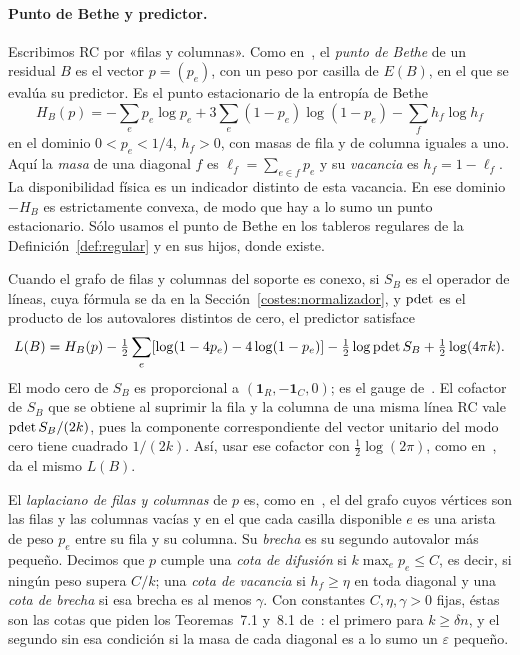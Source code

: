 \paragraph{Punto de Bethe y predictor.}
Escribimos RC por «filas y columnas». Como en~\cite{pred}, el \emph{punto de Bethe} de un residual
$B$ es el vector $p=(p_e)$, con un peso por casilla de $E(B)$, en el que se evalúa su predictor. Es
el punto estacionario de la entropía de Bethe
\begin{equation}\label{bethe}
 H_B(p)=-\sum_e p_e\log p_e+3\sum_e(1-p_e)\log(1-p_e)-\sum_fh_f\log h_f
\end{equation}
en el dominio $0<p_e<1/4$, $h_f>0$, con masas de fila y de columna iguales a uno. Aquí la
\emph{masa} de una diagonal $f$ es $\ell_f=\sum_{e\in f}p_e$ y su \emph{vacancia} es $h_f=1-\ell_f$.
La disponibilidad física es un indicador distinto de esta vacancia. En ese dominio $-H_B$ es
estrictamente convexa, de modo que hay a lo sumo un punto estacionario. Sólo usamos el punto de Bethe
en los tableros regulares de la Definición~\ref{def:regular} y en sus hijos, donde existe.

Cuando el grafo de filas y columnas del soporte es conexo, si $S_B$ es el operador de líneas, cuya
fórmula se da en la Sección~\ref{costes:normalizador}, y $\operatorname{pdet}$ es el producto de los autovalores
distintos de cero, el predictor satisface
\[
 L(B)=H_B(p)-\tfrac12\sum_e[\log(1-4p_e)-4\log(1-p_e)]
             -\tfrac12\log\operatorname{pdet} S_B+\tfrac12\log(4\pi k).
\]
El modo cero de $S_B$ es proporcional a $(\mathbf1_R,-\mathbf1_C,0)$; es el gauge de~\cite{pred}.
El cofactor de $S_B$ que se obtiene al suprimir la fila y la columna de una misma línea RC vale
$\operatorname{pdet} S_B/(2k)$, pues la componente correspondiente del vector unitario del modo cero tiene
cuadrado $1/(2k)$. Así, usar ese cofactor con $\tfrac12\log(2\pi)$, como
en~\cite[Secciones~6.1 y~7.1]{pred}, da el mismo $L(B)$.

El \emph{laplaciano de filas y columnas} de $p$ es, como en~\cite{pred}, el del grafo cuyos vértices
son las filas y las columnas vacías y en el que cada casilla disponible $e$ es una arista de peso
$p_e$ entre su fila y su columna. Su \emph{brecha} es su segundo autovalor más pequeño. Decimos que
$p$ cumple una \emph{cota de difusión} si $k\max_ep_e\le C$, es decir, si ningún peso supera
$C/k$; una \emph{cota de vacancia} si
$h_f\ge\eta$ en toda diagonal y una \emph{cota de brecha} si esa brecha es al menos $\gamma$. Con
constantes $C,\eta,\gamma>0$ fijas, éstas son las cotas que piden los Teoremas~7.1 y~8.1
de~\cite{pred}: el primero para $k\ge\delta n$, y el segundo sin esa condición si la masa de cada
diagonal es a lo sumo un $\varepsilon$ pequeño.

